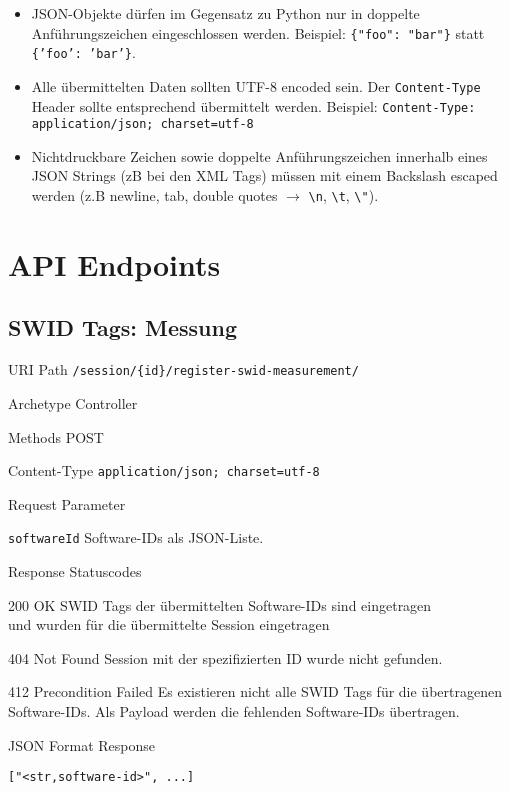 \documentclass[10pt,a4paper]{scrartcl}
\newcommand*{\escape}[1]{\texttt{\textbackslash#1}}
\begin{document}
\begin{itemize}
	\item JSON-Objekte dürfen im Gegensatz zu Python nur in doppelte
		Anführungszeichen eingeschlossen werden. Beispiel: \texttt{\{"foo": "bar"\}}
		statt \texttt{\{'foo': 'bar'\}}.
	\item Alle übermittelten Daten sollten UTF-8 encoded sein. Der
		\texttt{Content-Type} Header sollte entsprechend übermittelt werden.
		Beispiel: \texttt{Content-Type: application/json; charset=utf-8}
	\item Nichtdruckbare Zeichen sowie doppelte Anführungszeichen innerhalb eines
		JSON Strings (zB bei den XML Tags) müssen mit einem Backslash escaped werden
		(z.B newline, tab, double quotes $\rightarrow$ \escape{n}, \escape{t}, \escape{"}).
\end{itemize}


\pagebreak
\section{API Endpoints}

\subsection{SWID Tags: Messung}
\label{api:measurement}

\begin{mdframed}[style=def]
\begin{description*}
	\item[URI Path] \texttt{/session/\{id\}/register-swid-measurement/}
	\item[Archetype] Controller
	\item[Methods] POST
	\item[Content-Type] \texttt{application/json; charset=utf-8}
	\item[Request Parameter] \hfill
	\begin{description*}
		\item[\texttt{softwareId}] Software-IDs als JSON-Liste.
	\end{description*}
	\item[Response Statuscodes] \hfill
		\begin{description*}
			\item[200 OK] SWID Tags der übermittelten Software-IDs sind eingetragen \\
				und wurden für die übermittelte Session eingetragen
			\item[404 Not Found] Session mit der spezifizierten ID wurde nicht gefunden. 
			\item[412 Precondition Failed] Es existieren nicht alle SWID Tags für die
				übertragenen Software-IDs. Als Payload werden die fehlenden Software-IDs
				übertragen.
		\end{description*}
	\item[JSON Format Response] \hfill
\begin{lstlisting}
["<str,software-id>", ...]
\end{lstlisting}
\end{description*}
\end{mdframed}
\end{document}
